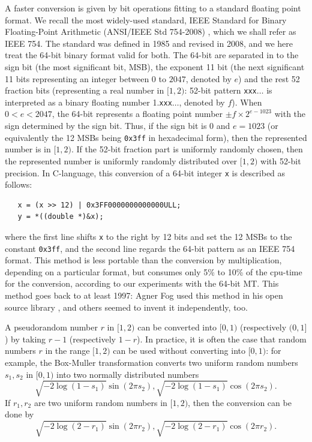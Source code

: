 \documentclass{svmult}
\begin{document}
A faster conversion is given by bit operations
fitting to a standard floating point format. We recall
the most widely-used standard, 
IEEE Standard for Binary Floating-Point Arithmetic (ANSI/IEEE Std
754-2008) \cite{ieee754}, which we shall refer as IEEE 754.
The standard was defined in 1985 and revised
in 2008, and we here treat the 64-bit binary format valid 
for both.
The 64-bit are separated in to 
the sign bit (the most significant bit, MSB),
the exponent 11 bit (the next significant 11 bits representing
an integer between $0$ to $2047$, denoted by $e$)
and the rest 52 fraction bits (representing a real number in $[1,2)$: 
52-bit pattern \texttt{xxx}$\ldots$ is interpreted
as a binary floating number 1.\texttt{xxx}$\ldots$, 
denoted by $f$).
When $0<e<2047$, the 64-bit
represents a floating point number
$\pm f \times 2^{e - 1023}$ with the sign determined by the
sign bit.
Thus, if the sign bit is 0 and $e=1023$ (or equivalently 
the 12 MSBs being \texttt{0x3ff} in hexadecimal form),
then the represented number is in $[1,2)$. If the 52-bit fraction part 
is uniformly randomly chosen, 
then the represented number is uniformly randomly distributed over $[1,2)$
with 52-bit precision.
In C-language, this conversion of a 64-bit integer \texttt{x} is described as follows:
\begin{verbatim}
   x = (x >> 12) | 0x3FF0000000000000ULL;
   y = *((double *)&x);
\end{verbatim}
where the first line shifts \texttt{x} to the right by 12 bits
and set the 12 MSBs to the constant \texttt{0x3ff}, 
and the second line regards the 64-bit pattern as an IEEE 754 format.
This method is less portable than the conversion by multiplication,
depending on a particular format,
but consumes only 5\% to 10\% of the cpu-time for the conversion,
according to our experiments with the 64-bit MT.
This method goes back to at least 1997: Agner Fog used this method in
his open source library \cite{web:Fog}, and others seemed to invent
it independently, too.

A pseudorandom number $r$ in $[1,2)$ can be converted into 
$[0,1)$ (respectively $(0,1]$) by taking $r-1$ (respectively $1-r$).
In practice, it is often the case that 
random numbers $r$ in the range $[1,2)$ can be used
without converting into $[0,1)$:
for example, the Box-Muller transformation 
converts two uniform random numbers $s_1,s_2$ in $[0,1)$ 
into two normally distributed numbers
$$
\sqrt{-2 \log(1-s_1)}\sin (2 \pi s_2), 
\sqrt{-2 \log(1-s_1)}\cos (2 \pi s_2).
$$
If $r_1, r_2$ are two uniform random numbers in $[1,2)$,
then the conversion can be done by 
$$
\sqrt{-2 \log(2-r_1)}\sin (2 \pi r_2), 
\sqrt{-2 \log(2-r_1)}\cos (2 \pi r_2).
$$ 
\end{document}
